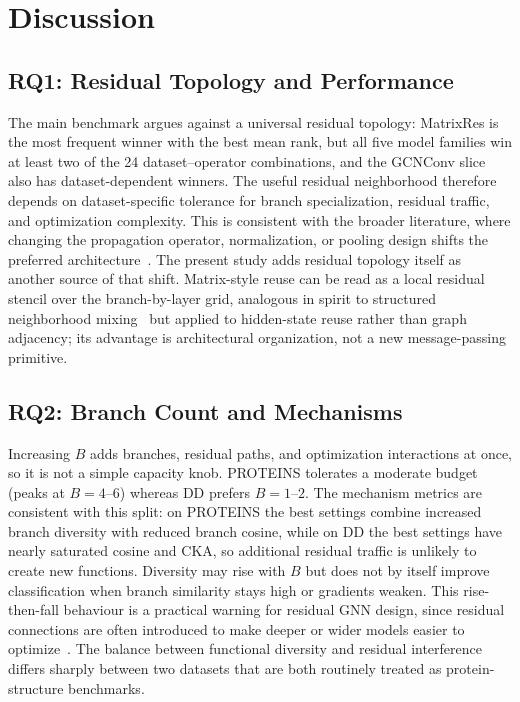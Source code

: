\section{Discussion}
\label{sec:discussion}

\subsection{RQ1: Residual Topology and Performance}
\label{sec:rq1}

The main benchmark argues against a universal residual topology: MatrixRes is
the most frequent winner with the best mean rank, but all five model families
win at least two of the 24 dataset--operator combinations, and the GCNConv slice
also has dataset-dependent winners. The useful residual neighborhood therefore
depends on dataset-specific tolerance for branch specialization, residual
traffic, and optimization complexity. This is consistent with the broader
literature, where changing the propagation operator, normalization, or pooling
design shifts the preferred
architecture~\cite{xu2019gin,hamilton2017inductive,ying2018hierarchical}. The
present study adds residual topology itself as another source of that shift.
Matrix-style reuse can be read as a local residual stencil over the
branch-by-layer grid, analogous in spirit to structured neighborhood
mixing~\cite{abu2019mixhop} but applied to hidden-state reuse rather than graph
adjacency; its advantage is architectural organization, not a new
message-passing primitive.

\subsection{RQ2: Branch Count and Mechanisms}
\label{sec:rq2}

Increasing \(B\) adds branches, residual paths, and optimization interactions at
once, so it is not a simple capacity knob. PROTEINS tolerates a moderate budget
(peaks at \(B=4\)--\(6\)) whereas DD prefers \(B=1\)--\(2\). The mechanism
metrics are consistent with this split: on PROTEINS the best settings combine
increased branch diversity with reduced branch cosine, while on DD the best
settings have nearly saturated cosine and CKA, so additional residual traffic is
unlikely to create new functions. Diversity may rise with \(B\) but does not by
itself improve classification when branch similarity stays high or gradients
weaken. This rise-then-fall behaviour is a practical warning for residual GNN
design, since residual connections are often introduced to make deeper or wider
models easier to optimize~\cite{he2016deep}. The balance between
functional diversity and residual interference differs sharply between two
datasets that are both routinely treated as protein-structure benchmarks.

